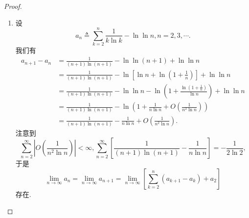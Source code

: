 \documentclass[../../main.tex]{subfiles}%
\begin{document}
\begin{proof}
\begin{enumerate}
\item 设
\[
a_n \triangleq \sum\limits_{k=2}^n \frac{1}{k \ln k} - \ln \ln n, n = 2, 3, \cdots.
\]
我们有
\[
\begin{aligned}
a_{n + 1} - a_n &= \frac{1}{(n + 1) \ln (n + 1)} - \ln \ln (n + 1) + \ln \ln n \\
&= \frac{1}{(n + 1) \ln (n + 1)} - \ln \left[ \ln n + \ln \left( 1 + \frac{1}{n} \right) \right] + \ln \ln n \\
&= \frac{1}{(n + 1) \ln (n + 1)} - \ln \ln n - \ln \left( 1 + \frac{\ln \left( 1 + \frac{1}{n} \right)}{\ln n} \right) + \ln \ln n \\
&= \frac{1}{(n + 1) \ln (n + 1)} - \ln \left( 1 + \frac{1}{n \ln n} + O \left( \frac{1}{n^2 \ln n} \right) \right) \\
&= \frac{1}{(n + 1) \ln (n + 1)} - \frac{1}{n \ln n} + O \left( \frac{1}{n^2 \ln n} \right).
\end{aligned}
\]
注意到
\[
\sum\limits_{n=2}^\infty \left| O \left( \frac{1}{n^2 \ln n} \right) \right| < \infty, \sum\limits_{n=2}^\infty \left[ \frac{1}{(n + 1) \ln (n + 1)} - \frac{1}{n \ln n} \right] = -\frac{1}{2 \ln 2},
\]
于是
\[
\lim_{n \to \infty} a_n = \lim_{n \to \infty} a_{n + 1} = \lim_{n \to \infty} \left[ \sum\limits_{k=2}^n (a_{k + 1} - a_k) + a_2 \right]
\]
存在.


\end{enumerate}
\end{proof}
\end{document}

